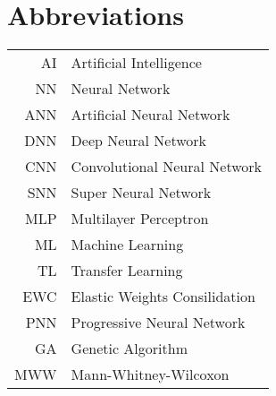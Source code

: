\chapter*{Abbreviations}
\begin{table}[h]
    \centering
    \begin{tabular}{r|l}
    
AI     & Artificial Intelligence\\
NN     & Neural Network\\
ANN    & Artificial Neural Network\\
DNN    & Deep Neural Network\\
CNN    & Convolutional Neural Network\\
SNN    & Super Neural Network\\
MLP    & Multilayer Perceptron\\
ML     & Machine Learning\\
TL     & Transfer Learning\\
EWC    & Elastic Weights Consilidation\\
PNN    & Progressive Neural Network\\
GA     & Genetic Algorithm\\
MWW    & Mann-Whitney-Wilcoxon

    \end{tabular}
\end{table}


